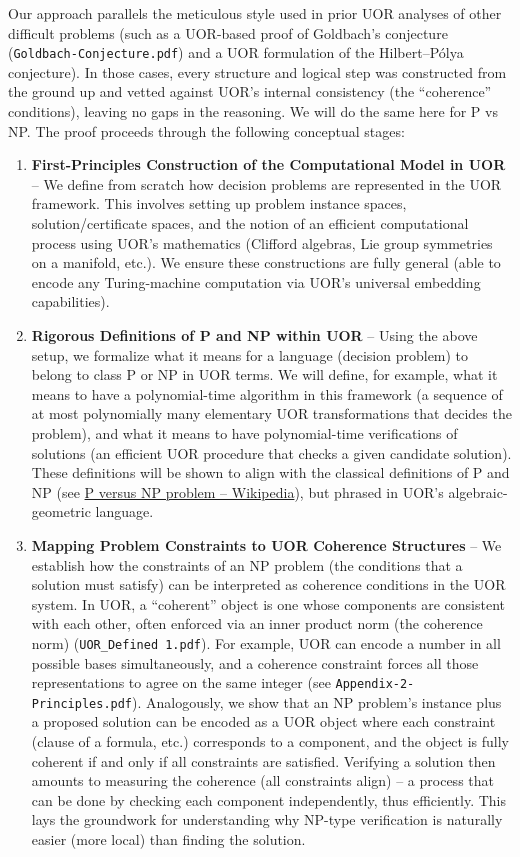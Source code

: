 \documentclass[11pt]{article}
\begin{document}
Our approach parallels the meticulous style used in prior UOR analyses of other difficult problems (such as a UOR-based proof of Goldbach’s conjecture (\texttt{Goldbach-Conjecture.pdf}) and a UOR formulation of the Hilbert--Pólya conjecture). In those cases, every structure and logical step was constructed from the ground up and vetted against UOR’s internal consistency (the “coherence” conditions), leaving no gaps in the reasoning. We will do the same here for P vs NP. The proof proceeds through the following conceptual stages:
\begin{enumerate}[label=\arabic*.]
    \item \textbf{First-Principles Construction of the Computational Model in UOR} -- We define from scratch how decision problems are represented in the UOR framework. This involves setting up problem instance spaces, solution/certificate spaces, and the notion of an efficient computational process using UOR’s mathematics (Clifford algebras, Lie group symmetries on a manifold, etc.). We ensure these constructions are fully general (able to encode any Turing-machine computation via UOR’s universal embedding capabilities).
    \item \textbf{Rigorous Definitions of P and NP within UOR} -- Using the above setup, we formalize what it means for a language (decision problem) to belong to class P or NP in UOR terms. We will define, for example, what it means to have a polynomial-time algorithm in this framework (a sequence of at most polynomially many elementary UOR transformations that decides the problem), and what it means to have polynomial-time verifications of solutions (an efficient UOR procedure that checks a given candidate solution). These definitions will be shown to align with the classical definitions of P and NP (see \href{https://en.wikipedia.org/wiki/P_versus_NP_problem}{P versus NP problem -- Wikipedia}), but phrased in UOR’s algebraic-geometric language.
    \item \textbf{Mapping Problem Constraints to UOR Coherence Structures} -- We establish how the constraints of an NP problem (the conditions that a solution must satisfy) can be interpreted as coherence conditions in the UOR system. In UOR, a “coherent” object is one whose components are consistent with each other, often enforced via an inner product norm (the coherence norm) (\texttt{UOR\_Defined 1.pdf}). For example, UOR can encode a number in all possible bases simultaneously, and a coherence constraint forces all those representations to agree on the same integer (see \texttt{Appendix-2-Principles.pdf}). Analogously, we show that an NP problem’s instance plus a proposed solution can be encoded as a UOR object where each constraint (clause of a formula, etc.) corresponds to a component, and the object is fully coherent if and only if all constraints are satisfied. Verifying a solution then amounts to measuring the coherence (all constraints align) -- a process that can be done by checking each component independently, thus efficiently. This lays the groundwork for understanding why NP-type verification is naturally easier (more local) than finding the solution.

\end{enumerate}
\end{document}
